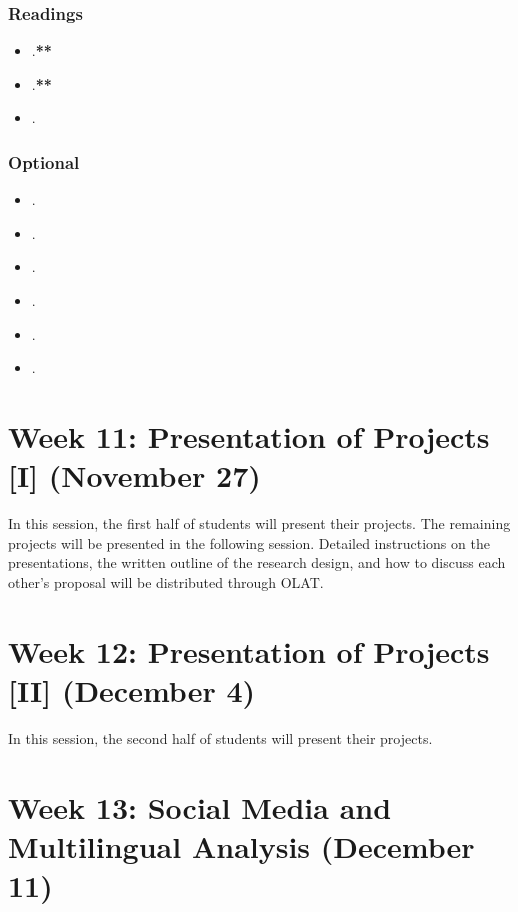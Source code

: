 \documentclass[abstract=on,parskip=full,headings=standardclasses,fontsize=11pt,paper=a4]{scrartcl}
\begin{document}
\subsubsection*{Readings}
\begin{itemize}
\item {}.\textbf{**}
\item {}.\textbf{**}
\item {}.
\end{itemize}


\subsubsection*{Optional}
\begin{itemize}
\item {}.
\item {}.
\item {}.
\item {}.
\item {}.
\item {}.
\end{itemize}

\section{Week 11: Presentation of Projects [I] (November 27)}

In this session, the first half of students will present their projects. The remaining projects will be presented in the following session. Detailed instructions on the presentations, the written outline of the research design, and how to discuss each other's proposal will be distributed through OLAT.


\section{Week 12: Presentation of Projects [II] (December 4)}

In this session, the second half of students will present their projects. 



\section{Week 13: Social Media and Multilingual Analysis (December 11)}
\end{document}
